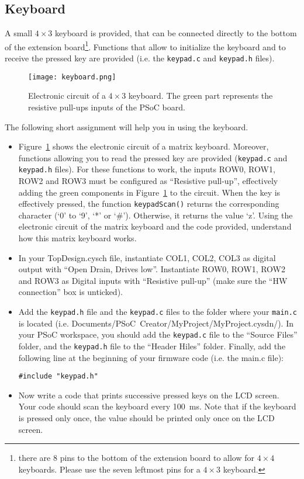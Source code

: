 \newpage
\subsection{Keyboard}

A small $4\times 3$ keyboard is provided, that can be connected directly to the bottom of the extension board\footnote{there are 8 pins to the bottom of the extension board to allow for $4\times 4$ keyboards. Please use the seven leftmost pins for a $4\times 3$ keyboard. }. Functions that allow to initialize the keyboard and to receive the pressed key are provided (i.e. the \texttt{keypad.c} and \texttt{keypad.h} files).
\begin{figure}[h]
	\centering
	\texttt{[image: keyboard.png]}
	\caption{Electronic circuit of a $4\times 3$ keyboard. The green part represents the resistive pull-ups inputs of the PSoC board. }
	\label{fig:keyboard}
\end{figure}
The following short assignment will help you in using the keyboard. 
\begin{itemize}
	\item Figure~\ref{fig:keyboard} shows the electronic circuit of a matrix keyboard. Moreover, functions allowing you to read the pressed key are provided (\texttt{keypad.c} and \texttt{keypad.h} files). For these functions to work, the inputs ROW0, ROW1, ROW2 and ROW3 must be configured as ``Resistive pull-up'', effectively adding the green components in Figure~\ref{fig:keyboard} to the circuit. When the key is effectively pressed, the function \texttt{keypadScan()} returns the corresponding character (‘0’ to ‘9’, ‘*’ or ‘\#’).	Otherwise, it returns the value ‘z’. Using the electronic circuit of the matrix keyboard and the code provided, understand how this matrix keyboard works.
    \item In your TopDesign.cysch file, instantiate COL1, COL2, COL3 as digital output with ``Open Drain, Drives low''. Instantiate ROW0, ROW1, ROW2 and ROW3 as Digital inputs with ``Resistive pull-up'' (make sure the ``HW connection'' box is unticked).
	\item Add the \texttt{keypad.h} file and the \texttt{keypad.c} files to the folder where your \texttt{main.c} is located (i.e. Documents/PSoC~Creator/MyProject/MyProject.cysdn/). In your PSoC workspace, you should add the \texttt{keypad.c} file to the ``Source Files'' folder, and the  \texttt{keypad.h} file to the ``Header Hiles'' folder. Finally, add the following line at the beginning of your firmware code (i.e. the main.c file):
\begin{lstlisting}[style=customc]
#include "keypad.h"	
\end{lstlisting}
	\item Now write a code that prints successive pressed keys on the LCD screen. Your code should scan the keyboard every 100~ms. Note that if the keyboard is pressed only once, the value should be printed only once on the LCD screen. 
\end{itemize}







